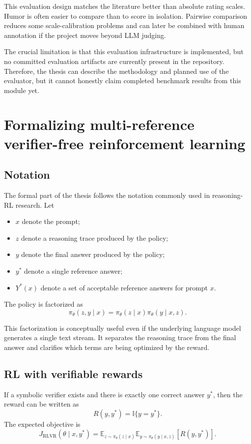 \documentclass[14pt,a4paper]{extreport}
\begin{document}
This evaluation design matches the literature better than absolute rating scales. Humor is often easier to compare than to score in isolation. Pairwise comparison reduces some scale-calibration problems and can later be combined with human annotation if the project moves beyond LLM judging.

The crucial limitation is that this evaluation infrastructure is implemented, but no committed evaluation artifacts are currently present in the repository. Therefore, the thesis can describe the methodology and planned use of the evaluator, but it cannot honestly claim completed benchmark results from this module yet.

\section{Formalizing multi-reference verifier-free reinforcement learning}

\subsection{Notation}

The formal part of the thesis follows the notation commonly used in reasoning-RL research. Let
\begin{itemize}
  \item \(x\) denote the prompt;
  \item \(z\) denote a reasoning trace produced by the policy;
  \item \(y\) denote the final answer produced by the policy;
  \item \(y^{*}\) denote a single reference answer;
  \item \(Y^{*}(x)\) denote a set of acceptable reference answers for prompt \(x\).
\end{itemize}

The policy is factorized as
\[
  \pi_{\theta}(z,y\mid x)=\pi_{\theta}(z\mid x)\pi_{\theta}(y\mid x,z).
\]

This factorization is conceptually useful even if the underlying language model generates a single text stream. It separates the reasoning trace from the final answer and clarifies which terms are being optimized by the reward.

\subsection{RL with verifiable rewards}

If a symbolic verifier exists and there is exactly one correct answer \(y^{*}\), then the reward can be written as
\[
  R(y,y^{*})=\mathbb{I}\{y=y^{*}\}.
\]
The expected objective is
\[
  J_{\text{RLVR}}(\theta\mid x,y^{*})=\mathbb{E}_{z\sim\pi_{\theta}(z\mid x)}
  \mathbb{E}_{y\sim\pi_{\theta}(y\mid x,z)}[R(y,y^{*})].
\]
\end{document}
